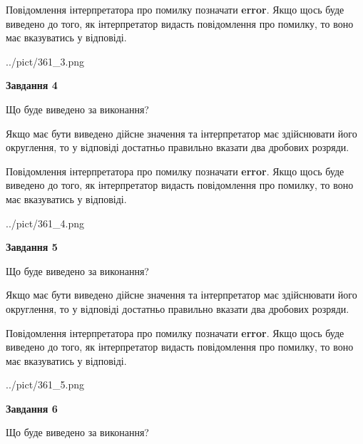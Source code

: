 \documentclass[12pt, ukrainian]{article}
\begin{document}
{\begin {Large}
Повідомлення інтерпретатора про помилку позначати \textbf{error}.
Якщо щось буде виведено до того, як інтерпретатор видасть повідомлення про помилку, 
то воно має вказуватись у відповіді. \par

\begin{center}
	{../pict/361_3.png}
\end{center}
\newpage

{\begin {center}\textbf{Завдання 4}\end {center}}\par
Що буде виведено за виконання? \par

Якщо має бути виведено дійсне значення та інтерпретатор має здійснювати його округлення, 
то у відповіді достатньо правильно вказати два дробових розряди.

Повідомлення інтерпретатора про помилку позначати \textbf{error}.
Якщо щось буде виведено до того, як інтерпретатор видасть повідомлення про помилку, 
то воно має вказуватись у відповіді. \par

\begin{center}
	{../pict/361_4.png}
\end{center}
\newpage

{\begin {center}\textbf{Завдання 5}\end {center}}\par
Що буде виведено за виконання? \par

Якщо має бути виведено дійсне значення та інтерпретатор має здійснювати його округлення, 
то у відповіді достатньо правильно вказати два дробових розряди.

Повідомлення інтерпретатора про помилку позначати \textbf{error}.
Якщо щось буде виведено до того, як інтерпретатор видасть повідомлення про помилку, 
то воно має вказуватись у відповіді. \par

\begin{center}
	{../pict/361_5.png}
\end{center}
\newpage

{\begin {center}\textbf{Завдання 6}\end {center}}\par
Що буде виведено за виконання? \par


\end{Large}}
\end{document}
